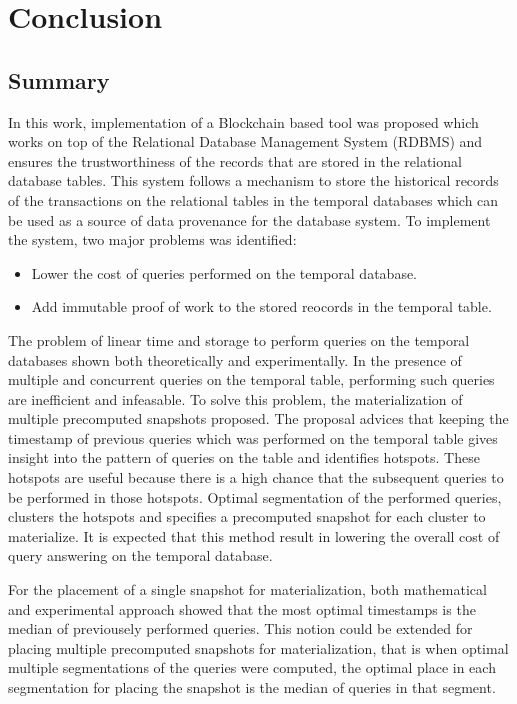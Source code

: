 \chapter{Conclusion}

	\section{Summary}
		In this work, implementation of a Blockchain based tool was proposed which works on top of the Relational Database Management System (RDBMS) and ensures the trustworthiness of the records that are stored in the relational database tables. This system follows a mechanism to store the historical records of the transactions on the relational tables in the temporal databases which can be used as a source of data provenance for the database system. To implement the system, two major problems was identified: 
		\begin{itemize}
			\item Lower the cost of queries performed on the temporal database.
			\item Add immutable proof of work to the stored reocords in the temporal table.
		\end{itemize}

		The problem of linear time and storage to perform queries on the temporal databases shown both theoretically and experimentally. In the presence of multiple and concurrent queries on the temporal table, performing such queries are inefficient and infeasable. To solve this problem, the materialization of multiple precomputed snapshots proposed. The proposal advices that keeping the timestamp of previous queries which was performed on the temporal table
		gives insight into the pattern of queries on the table and identifies hotspots. These hotspots are useful because there is a high chance that the subsequent queries to be performed in those hotspots. Optimal segmentation of the performed queries, clusters the hotspots and specifies a precomputed snapshot for each cluster to materialize. It is expected that this method result in lowering the overall cost of query answering on the temporal database.

		For the placement of a single snapshot for materialization, both mathematical and experimental approach showed that the most optimal timestamps is the median of previousely performed queries. This notion could be extended for placing multiple precomputed snapshots for materialization, that is when optimal multiple segmentations of the queries were computed, the optimal place in each segmentation for placing the snapshot is the median of queries in that segment.

